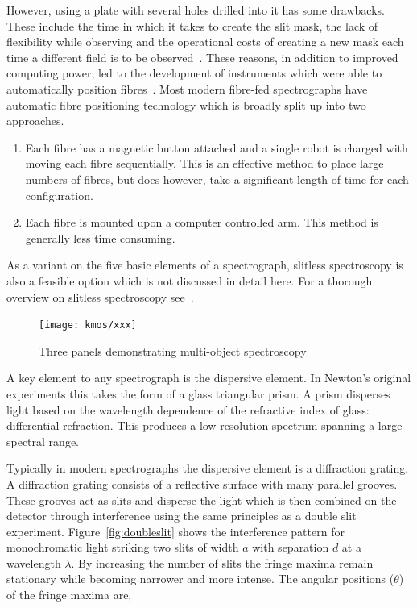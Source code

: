 However, using a plate with several holes drilled into it has some drawbacks.
These include the time in which it takes to create the slit mask, the lack of flexibility while observing and the operational costs of creating a new mask each time a different field is to be observed~\citep{1986SPIE..627..118P}.
These reasons, in addition to improved computing power, led to the development of instruments which were able to automatically position fibres~\citep{1982SPIE..331..289T}.
Most modern fibre-fed spectrographs have automatic fibre positioning technology which is broadly split up into two approaches.

\begin{enumerate}
    \item Each fibre has a magnetic button attached and a single robot is charged with moving each fibre sequentially.
    This is an effective method to place large numbers of fibres, but does however, take a significant length of time for each configuration.
    \item Each fibre is mounted upon a computer controlled arm.
    This method is generally less time consuming.
\end{enumerate}

As a variant on the five basic elements of a spectrograph, slitless spectroscopy is also a feasible option which is not discussed in detail here.
For a thorough overview on slitless spectroscopy see~\citet{2014PhDT.........C}.

\begin{figure}
 \centering
 \texttt{[image: kmos/xxx]}
 \caption[Multi-object Spectroscopy]{Three panels demonstrating multi-object spectroscopy
 \label{fig:long-slit}}
\end{figure}

A key element to any spectrograph is the dispersive element.
In Newton's original experiments this takes the form of a glass triangular prism.
A prism disperses light based on the wavelength dependence of the refractive index of glass: differential refraction.
This produces a low-resolution spectrum spanning a large spectral range.

Typically in modern spectrographs the dispersive element is a diffraction grating.
A diffraction grating consists of a reflective surface with many parallel grooves.
These grooves act as slits and disperse the light which is then combined on the detector through interference using the same principles as a double slit experiment.
Figure~\ref{fig:doubleslit} shows the interference pattern for monochromatic light striking two slits of width $a$ with separation $d$ at a wavelength $\lambda$.
By increasing the number of slits the fringe maxima remain stationary while becoming narrower and more intense.
The angular positions ($\theta$) of the fringe maxima are,


